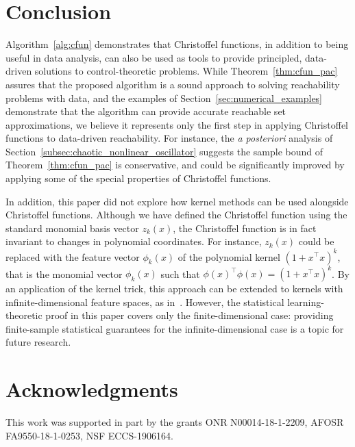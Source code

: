\documentclass[letterpaper, 10 pt, conference]{ieeeconf}
\begin{document}
\section{Conclusion}

Algorithm~\ref{alg:cfun} demonstrates that Christoffel functions, in addition to being useful in data analysis, can also be used as tools to provide principled, data-driven solutions to control-theoretic problems. While Theorem~\ref{thm:cfun_pac} assures that the proposed algorithm is a sound approach to solving reachability problems with data, and the examples of Section~\ref{sec:numerical_examples} demonstrate that the algorithm can provide accurate reachable set approximations, we believe it represents only the first step in applying Christoffel functions to data-driven reachability. For instance, the \emph{a posteriori} analysis of Section~\ref{subsec:chaotic_nonlinear_oscillator} suggests the sample bound of Theorem~\ref{thm:cfun_pac} is conservative, and could be significantly improved by applying some of the special properties of Christoffel functions. 

In addition, this paper did not explore how kernel methods can be used alongside Christoffel functions.
 Although we have defined the Christoffel function using the standard monomial basis vector $z_k(x)$,
the Christoffel function is in fact invariant to changes in polynomial
coordinates. For instance, $z_k(x)$ could be replaced with the feature vector
$\phi_k(x)$ of the polynomial kernel $(1+x^\top x)^k$, that is the monomial vector
$\phi_k(x)$ such that $\phi(x)^\top\phi(x)=(1+x^\top x)^k$. By an application of the kernel trick, this approach can be extended to kernels with infinite-dimensional feature spaces, as in~\cite{askari2018kernel}. However, the statistical learning-theoretic proof in this paper covers only the finite-dimensional case: providing finite-sample statistical guarantees for the infinite-dimensional case is a topic for future research.

\section*{Acknowledgments}

\begin{flushleft}
This work was supported in part by the grants ONR N00014-18-1-2209, AFOSR 
FA9550-18-1-0253, NSF ECCS-1906164.
\end{flushleft}





\end{document}
